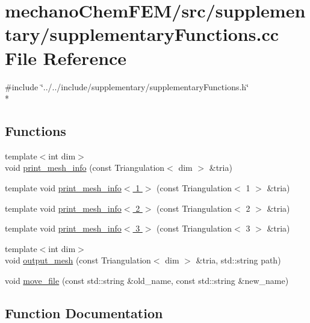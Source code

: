 \section{mechano\-Chem\-F\-E\-M/src/supplementary/supplementary\-Functions.cc File Reference}
\label{supplementary_functions_8cc}
{\ttfamily \#include \char`\"{}../../include/supplementary/supplementary\-Functions.\-h\char`\"{}}\\*
\subsection*{Functions}
\begin{DoxyCompactItemize}
\item 
{\footnotesize template$<$int dim$>$ }\\void \hyperlink{group___supplementary_ga2971a293263dddc17f3df81add2ffbbe}{print\-\_\-mesh\-\_\-info} (const Triangulation$<$ dim $>$ \&tria)
\item 
template void \hyperlink{supplementary_functions_8cc_a27ee4a9830113522595a507a921b56e5}{print\-\_\-mesh\-\_\-info$<$ 1 $>$} (const Triangulation$<$ 1 $>$ \&tria)
\item 
template void \hyperlink{supplementary_functions_8cc_a26717733da51a761f009de3a1e57cf15}{print\-\_\-mesh\-\_\-info$<$ 2 $>$} (const Triangulation$<$ 2 $>$ \&tria)
\item 
template void \hyperlink{supplementary_functions_8cc_a6bd7935769f623c78960b765b08865c2}{print\-\_\-mesh\-\_\-info$<$ 3 $>$} (const Triangulation$<$ 3 $>$ \&tria)
\item 
{\footnotesize template$<$int dim$>$ }\\void \hyperlink{group___supplementary_ga0272b346b175b931e89b017fd93b5b80}{output\-\_\-mesh} (const Triangulation$<$ dim $>$ \&tria, std\-::string path)
\item 
void \hyperlink{group___supplementary_gae0eb2d2afc3e33a9bb3b409b0171c470}{move\-\_\-file} (const std\-::string \&old\-\_\-name, const std\-::string \&new\-\_\-name)
\end{DoxyCompactItemize}


\subsection{Function Documentation}
